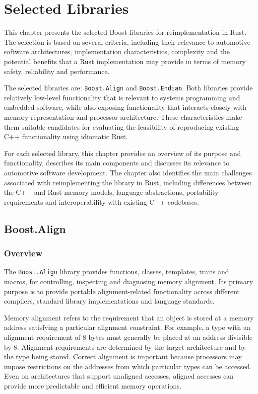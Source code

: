 \chapter{Selected Libraries}
\label{chap:Chapter5}

This chapter presents the selected Boost libraries for reimplementation in Rust.
The selection is based on several criteria, including their relevance to automotive software architectures, implementation characteristics, 
complexity and the potential benefits that a Rust implementation may provide in terms of memory safety, reliability and performance.

The selected libraries are: \texttt{Boost.Align} and \texttt{Boost.Endian}. Both libraries provide relatively low-level functionality
that is relevant to systems programming and embedded software, while also exposing functionality that interacts closely with memory
representation and processor architecture. These characteristics make them suitable candidates for evaluating the feasibility of 
reproducing existing C++ functionality using idiomatic Rust.

For each selected library, this chapter provides an overview of its purpose and functionality, describes its main components and discusses
its relevance to automotive software development. The chapter also identifies the main challenges associated with reimplementing the library
in Rust, including differences between the C++ and Rust memory models, language abstractions, portability requirements and interoperability
with existing C++ codebases.

\section{Boost.Align}
\subsection{Overview}

The \texttt{Boost.Align} library provides functions, classes, templates, traits and macros, for controlling, inspecting and diagnosing 
memory alignment. Its primary purpose is to provide portable alignment-related functionality across different compilers, standard library
implementations and language standards.

Memory alignment refers to the requirement that an object is stored at a memory address satisfying a particular alignment constraint. 
For example, a type with an alignment requirement of 8 bytes must generally be placed at an address divisible by 8. 
Alignment requirements are determined by the target architecture and by the type being stored. 
Correct alignment is important because processors may impose restrictions on the addresses from which particular types can be accessed. 
Even on architectures that support unaligned accesses, aligned accesses can provide more predictable and efficient memory operations.

